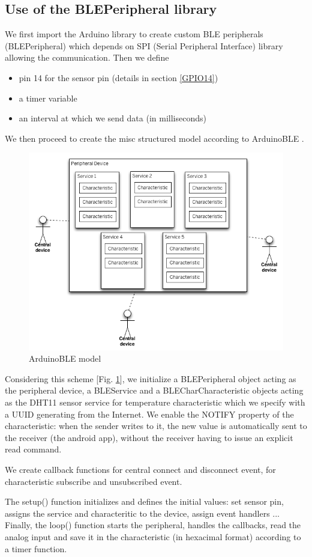 \subsection{Use of the BLEPeripheral library}
We first import the Arduino library to create custom BLE peripherals (BLEPeripheral) which depends on SPI (Serial Peripheral Interface) library allowing the communication.
Then we define 
\begin{itemize}
    \item pin 14 for the sensor pin (details in section \ref{GPIO14})
    \item a timer variable
    \item an interval at which we send data (in milliseconds)
\end{itemize}
We then proceed to create the misc structured model according to ArduinoBLE \cite{b3}.
\begin{figure}[!htb]%
    \centering
    \includegraphics[scale=0.2]{images/ble-bulletin-board-model.png}%
    \caption{ArduinoBLE model}%
    \label{fig:ArduinoBLE}%
\end{figure}
Considering this scheme [Fig. \ref{fig:ArduinoBLE}], we initialize a BLEPeripheral object acting as the peripheral device, a BLEService and a BLECharCharacteristic objects acting as the DHT11 sensor service for temperature characteristic which we specify with a UUID generating from the Internet.
We enable the NOTIFY property of the characteristic: when the sender writes to it, the new value is automatically sent to the receiver (the android app), without the receiver having to issue an explicit read command.

We create callback functions for central connect and disconnect event, for characteristic subscribe and unsubscribed event.

The setup() function initializes and defines the initial values: set sensor pin, assigns the service and characteritic to the device, assign event handlers ...
Finally, the loop() function starts the peripheral, handles the callbacks, read the analog input and save it in the characteristic (in hexacimal format) according to a timer function.